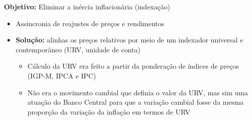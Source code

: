 \documentclass[11pt]{article}
\begin{document}
\textbf{Objetivo:} Eliminar  a inércia inflacionária (indexação)
\begin{itemize}
\item Assincronia de reajustes de preços e rendimentos
\item \textbf{Solução:} alinhas os preços relativos por meio de um indexador universal e contemporâneo (URV, unidade de conta)
\begin{itemize}
\item Cálculo da URV era feito a partir da ponderação de índices de preços (IGP-M, IPCA e IPC)
\item Não era o movimento cambial que definia o valor da URV, mas sim uma atuação do Banco Central para que a variação cambial fosse da mesma proporção da variação da inflação em termos de URV
\end{itemize}
\end{itemize}
\end{document}
